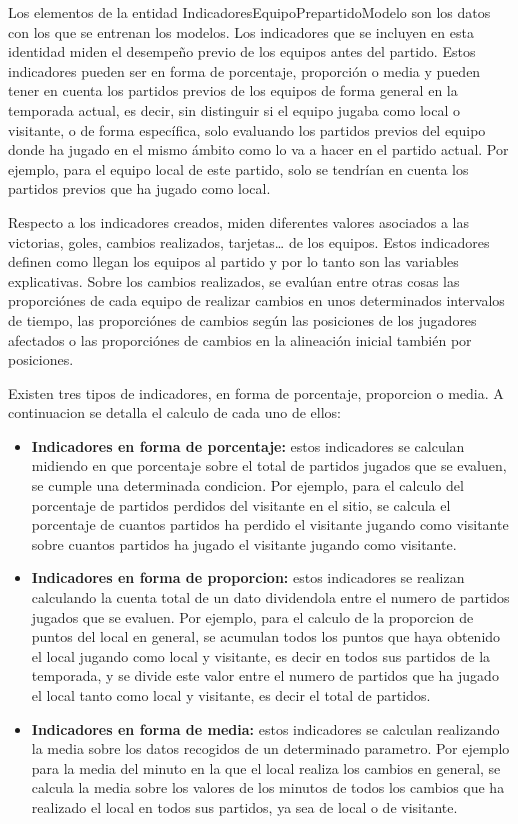 Los elementos de la entidad IndicadoresEquipoPrepartidoModelo son los datos con los que se 
entrenan los modelos. Los indicadores que se incluyen en esta identidad miden el desempeño 
previo de los equipos antes del partido. Estos indicadores pueden ser en forma de porcentaje, 
proporción o media y pueden tener en cuenta los partidos previos de los equipos de forma general
en la temporada actual, es decir, sin distinguir si el equipo jugaba como local o visitante, o de 
forma específica, solo evaluando los partidos previos del equipo donde ha jugado en el mismo 
ámbito como lo va a hacer en el partido actual. Por ejemplo, para el equipo local de este partido, 
solo se tendrían en cuenta los partidos previos que ha jugado como local.

Respecto a los indicadores creados, miden diferentes valores asociados a las victorias, goles, 
cambios realizados, tarjetas… de los equipos. Estos indicadores definen como llegan los equipos 
al partido y por lo tanto son las variables explicativas. Sobre los cambios realizados, se evalúan 
entre otras cosas las proporciónes de cada equipo de realizar cambios en unos determinados 
intervalos de tiempo, las proporciónes de cambios según las posiciones de los jugadores afectados 
o las proporciónes de cambios en la alineación inicial también por posiciones. 

Existen tres tipos de indicadores, en forma de porcentaje, proporcion o media. A continuacion se detalla el calculo de cada uno de ellos:
\begin{itemize}
    \item \textbf{Indicadores en forma de porcentaje:} estos indicadores se calculan midiendo en que porcentaje sobre el total de partidos jugados que se evaluen, se cumple una determinada condicion. Por ejemplo, para el calculo del porcentaje de partidos perdidos del visitante en el sitio, se calcula el porcentaje de cuantos partidos ha perdido el visitante jugando como visitante sobre cuantos partidos ha jugado el visitante jugando como visitante.
    \item \textbf{Indicadores en forma de proporcion:} estos indicadores se realizan calculando la cuenta total de un dato dividendola entre el numero de partidos jugados que se evaluen. Por ejemplo, para el calculo de la proporcion de puntos del local en general, se acumulan todos los puntos que haya obtenido el local jugando como local y visitante, es decir en todos sus partidos de la temporada, y se divide este valor entre el numero de partidos que ha jugado el local tanto como local y visitante, es decir el total de partidos.
    \item \textbf{Indicadores en forma de media:} estos indicadores se calculan realizando la media sobre los datos recogidos de un determinado parametro. Por ejemplo para la media del minuto en la que el local realiza los cambios en general, se calcula la media sobre los valores de los minutos de todos los cambios que ha realizado el local en todos sus partidos, ya sea de local o de visitante.
\end{itemize}


